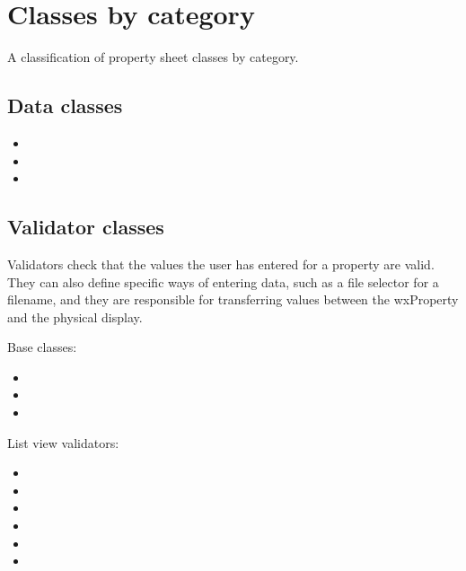 \section{Classes by category}\label{proplistclassesbycat}

A classification of property sheet classes by category.

\subsection{Data classes}

\begin{itemize}\itemsep=0pt
\item {}
\item {}
\item {}
\end{itemize}


\subsection{Validator classes}\label{proplistvalidatorclasses}

Validators check that the values the user has entered for a property are
valid. They can also define specific ways of entering data, such as a
file selector for a filename, and they are responsible for transferring
values between the wxProperty and the physical display. 

Base classes:

\begin{itemize}\itemsep=0pt
\item {}
\item {}
\item {}
\end{itemize}

List view validators:

\begin{itemize}\itemsep=0pt
\item {}
\item {}
\item {}
\item {}
\item {}
\item {}
\end{itemize}

